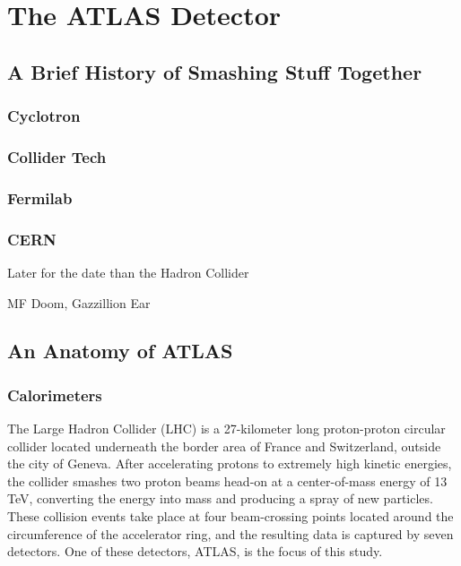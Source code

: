 \chapter{The ATLAS Detector}

\section{A Brief History of Smashing Stuff Together}

\subsection{Cyclotron}

\subsection{Collider Tech}

\subsection{Fermilab}

\subsection{CERN}

\setlength{\epigraphwidth}{3in}
\epigraph{Later for the date than the Hadron Collider}{MF Doom, Gazzillion Ear}

\section{An Anatomy of ATLAS}

\subsection{Calorimeters}


The Large Hadron Collider (LHC) is a 27-kilometer long proton-proton circular collider located underneath the border area of France and Switzerland, outside the city of Geneva. After accelerating protons to extremely high kinetic energies, the collider smashes two proton beams head-on at a center-of-mass energy of 13 TeV, converting the energy into mass and producing a spray of new particles. These collision events take place at four beam-crossing points located around the circumference of the accelerator ring, and the resulting data is captured by seven detectors. One of these detectors, ATLAS, is the focus of this study.

